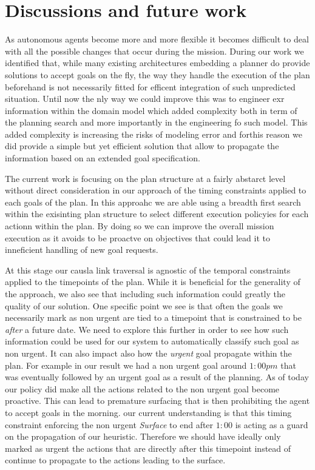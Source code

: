 \section{Discussions and future work}
\label{sec:conclude}

As autonomous agents become more and more flexible it becomes difficult
to deal with all the possible changes that occur during the
mission. During our work we identified that, while many existing 
architectures embedding a planner do provide solutions to accept goals
on the fly, the way they handle the execution of the plan beforehand
is not necessarily fitted for efficent integration of such unpredicted
situation. Until now the nly way we could improve this was to engineer
exr information within the domain model which added complexity both in
term of the planning search and more importantly in the engineering fo
such model. This added complexity is increasing the risks of modeling
error and forthis reason we did provide a simple but yet efficient
solution that allow to propagate the information based on an extended
goal specification. 


The current work is focusing on the plan  structure at a fairly
abstarct level without direct consideration in our approach of the
timing constraints applied to each goals of the plan. In this approahc
we are able using a breadth first search within the exisinting plan
structure to select different execution policyies for each actionn
within the plan. By doing so we can improve the overall mission 
execution as it avoids to be proactve on objectives that could lead it
to inneficient handling of new goal requests.

At this stage our causla link traversal is agnostic of the temporal 
constraints applied to the timepoints of the plan. While it is
beneficial for the generality of the approach, we also see that
including such information could greatly the quality of our solution. 
One specific point we see is that often the goals we necessarily mark
as non urgent are tied to a timepoint that is constrained to be {\em
  after} a future date. We need to explore this further in order to
see how such information could be used for our system to automatically
classify such goal as non urgent. It can also impact  also how the
{\em urgent} goal propagate within the plan. For example in our result
we had a non urgent goal around $1:00 pm$ that was eventually 
followed by an urgent goal as a result of the planning. As of today 
our policy did make all the actions related to the non urgent goal 
become proactive. This can lead to premature surfacing that is then 
prohibiting the agent to accept goals in the morning. our current
understanding is that this timing constraint enforcing the non
urgent {\em Surface} to end after $1:00$ is acting as a guard on the
propagation of our heuristic. Therefore we should have ideally only
marked as urgent the actions that are directly after this timepoint
instead of continue to propagate to the actions leading to the
surface. 

